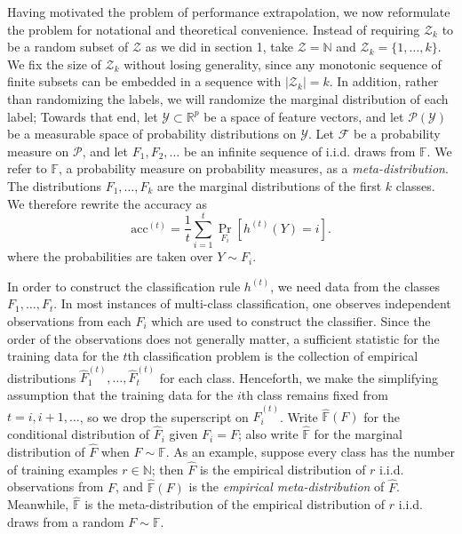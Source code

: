 \documentclass{article}
\begin{document}
Having motivated the problem of performance extrapolation,
we now reformulate the problem for notational and theoretical convenience.
Instead of requiring $\mathcal{Z}_k$ to be a random subset of $\mathcal{Z}$ as we did in section 1, take
$\mathcal{Z}=\mathbb{N}$ and $\mathcal{Z}_k = \{1,\hdots, k\}$.
We fix the size of $\mathcal{Z}_k$ without losing generality, since any monotonic sequence of 
finite subsets can be embedded in a sequence with $|\mathcal{Z}_k| = k$.
In addition, rather than randomizing the labels, we will randomize the marginal distribution of each label;
Towards that end, let $\mathcal{Y} \subset \mathbb{R}^p$ be a space of feature vectors, and
let $\mathcal{P}(\mathcal{Y})$ be a measurable space of probability distributions on $\mathcal{Y}$.
Let $\mathcal{F}$ be a probability measure on $\mathcal{P}$,
and let $F_1, F_2,\hdots$ be an infinite sequence of i.i.d. draws from $\mathbb{F}$.
We refer to $\mathbb{F}$, a probability measure on probability measures, as a \emph{meta-distribution}.
The distributions $F_1,\hdots, F_k$ are the marginal distributions of the first $k$ classes.
We therefore rewrite the accuracy as
\[
\text{acc}^{(t)} = \frac{1}{t}\sum_{i=1}^t \Pr_{F_i}[h^{(t)}(Y) = i].
\]
where the probabilities are taken over $Y \sim F_i$.

In order to construct the classification rule $h^{(t)}$, we need data from the classes $F_1,\hdots, F_t$.
In most instances of multi-class classification, one observes independent observations from each $F_i$
which are used to construct the classifier.  Since the order of the observations
does not generally matter, a sufficient statistic for the training data for the $t$th classification problem
is the collection of empirical distributions
$\hat{F}_1^{(t)},\hdots,\hat{F}_t^{(t)}$ for each class.
Henceforth, we make the simplifying assumption that the training data for the $i$th class remains fixed
from $t =i, i+1,\hdots$, so we drop the superscript on $\hat{F}_i^{(t)}$.
Write $\hat{\mathbb{F}}(F)$ for the conditional distribution of $\hat{F}_i$ given  $F_i = F$;
also write $\hat{\mathbb{F}}$ for the marginal distribution of $\hat{F}$ when $F \sim \mathbb{F}.$
As an example, suppose every class has the number of training examples $r \in \mathbb{N}$; then $\hat{F}$
is the empirical distribution of $r$ i.i.d. observations from $F$, and $\hat{\mathbb{F}}(F)$ is the \emph{empirical meta-distribution} of $\hat{F}$.
Meanwhile, $\hat{\mathbb{F}}$ is the meta-distribution of the empirical distribution of $r$ i.i.d. draws from a random $F \sim \mathbb{F}$.
\end{document}
